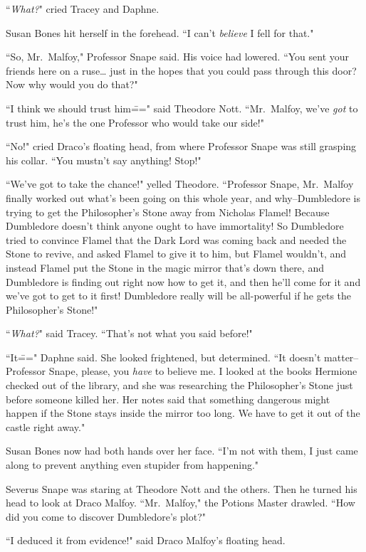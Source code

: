 ``\emph{What?}" cried Tracey and Daphne.

Susan Bones hit herself in the forehead. ``I can't \emph{believe} I fell for that."

``So, Mr.~Malfoy," Professor Snape said. His voice had lowered. ``You sent your friends here on a ruse{\ldots} just in the hopes that you could pass through this door? Now why would you do that?"

``I think we should trust him\===" said Theodore Nott. ``Mr.~Malfoy, we've \emph{got} to trust him, he's the one Professor who would take our side!"

``No!" cried Draco's floating head, from where Professor Snape was still grasping his collar. ``You mustn't say anything! Stop!"

``We've got to take the chance!" yelled Theodore. ``Professor Snape, Mr.~Malfoy finally worked out what's been going on this whole year, and why\---Dumbledore is trying to get the Philosopher's Stone away from Nicholas Flamel! Because Dumbledore doesn't think anyone ought to have immortality! So Dumbledore tried to convince Flamel that the Dark Lord was coming back and needed the Stone to revive, and asked Flamel to give it to him, but Flamel wouldn't, and instead Flamel put the Stone in the magic mirror that's down there, and Dumbledore is finding out right now how to get it, and then he'll come for it and we've got to get to it first! Dumbledore really will be all-powerful if he gets the Philosopher's Stone!"

``\emph{What?}" said Tracey. ``That's not what you said before!"

``It\===" Daphne said. She looked frightened, but determined. ``It doesn't matter\---Professor Snape, please, you \emph{have} to believe me. I looked at the books Hermione checked out of the library, and she was researching the Philosopher's Stone just before someone killed her. Her notes said that something dangerous might happen if the Stone stays inside the mirror too long. We have to get it out of the castle right away."

Susan Bones now had both hands over her face. ``I'm not with them, I just came along to prevent anything even stupider from happening."

Severus Snape was staring at Theodore Nott and the others. Then he turned his head to look at Draco Malfoy. ``Mr.~Malfoy," the Potions Master drawled. ``How did you come to discover Dumbledore's plot?"

``I deduced it from evidence!" said Draco Malfoy's floating head.

